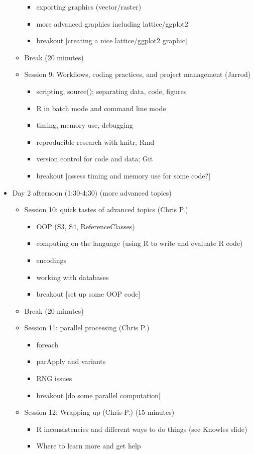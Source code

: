\documentclass[12pt]{article}\usepackage{graphicx, color}
\begin{document}
\begin{itemize}
\begin{itemize}
\begin{itemize}
\item exporting graphics (vector/raster)
\item more advanced graphics including lattice/ggplot2 
\item breakout {[}creating a nice lattice/ggplot2 graphic{]}
\end{itemize}
\item Break (20 minutes)
\item Session 9: Workflows, coding practices, and project management (Jarrod)

\begin{itemize}
\item scripting, source(); separating data, code, figures
\item R in batch mode and command line mode
\item timing, memory use, debugging
\item reproducible research with knitr, Rmd
\item version control for code and data; Git
\item breakout {[}assess timing and memory use for some code?{]}
\end{itemize}
\end{itemize}
\item Day 2 afternoon (1:30-4:30) (more advanced topics) 

\begin{itemize}
\item Session 10: quick tastes of advanced topics (Chris P.)

\begin{itemize}
\item OOP (S3, S4, ReferenceClasses)
\item computing on the language (using R to write and evaluate R code)
\item encodings
\item working with databases
\item breakout {[}set up some OOP code{]}
\end{itemize}
\item Break (20 minutes)
\item Session 11: parallel processing (Chris P.)

\begin{itemize}
\item foreach
\item parApply and variants
\item RNG issues
\item breakout {[}do some parallel computation{]}
\end{itemize}
\item Session 12: Wrapping up (Chris P.) (15 minutes)

\begin{itemize}
\item R inconsistencies and different ways to do things (see Knowles slide)
\item Where to learn more and get help\end{itemize}
\end{itemize}
\end{itemize}
\end{document}
